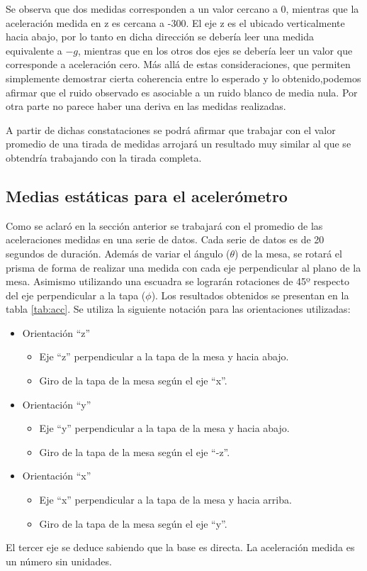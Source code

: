 \documentclass[main]{subfiles}
\begin{document}
Se observa que dos medidas corresponden a un valor cercano a 0, mientras que la aceleración medida en z es cercana a -300. El eje z es el ubicado verticalmente hacia abajo, por lo tanto en dicha dirección se debería leer una medida equivalente a $-g$, mientras que en los otros dos ejes se debería leer un valor que corresponde a aceleración cero. Más allá de estas consideraciones, que permiten simplemente demostrar cierta coherencia entre lo esperado y lo obtenido,podemos afirmar que el ruido observado es asociable a un ruido blanco de media nula. Por otra parte no parece haber una deriva en las medidas realizadas. 

A partir de dichas constataciones se podrá afirmar que trabajar con el valor promedio de una tirada de medidas arrojará un resultado muy similar al que se obtendría trabajando con la tirada completa. 


\subsection{Medias estáticas para el acelerómetro}

Como se aclaró en la sección anterior se trabajará con el promedio de las aceleraciones medidas en una serie de datos. Cada serie de datos es de 20 segundos de duración. Además de variar el ángulo ($\theta$) de la mesa, se rotará el prisma de forma de realizar una medida con cada eje perpendicular al plano de la mesa. Asimismo utilizando una escuadra se lograrán rotaciones de 45º respecto del eje perpendicular a la tapa ($\phi$). Los resultados obtenidos se presentan en la tabla \ref{tab:acc}. Se utiliza la siguiente notación para las orientaciones utilizadas:
\begin{itemize}
	\item Orientación ``z''
	\begin{itemize}
		\item Eje ``z'' perpendicular a la tapa de la mesa y hacia abajo.
		\item Giro de la tapa de la mesa según el eje ``x''.
	\end{itemize}
	\item Orientación ``y''
	\begin{itemize}
		\item Eje ``y'' perpendicular a la tapa de la mesa y hacia abajo.
		\item Giro de la tapa de la mesa según el eje ``-z''.
	\end{itemize}
	\item Orientación ``x''
	\begin{itemize}
		\item Eje ``x'' perpendicular a la tapa de la mesa y hacia arriba.
		\item Giro de la tapa de la mesa según el eje ``y''.
	\end{itemize}
\end{itemize}
El tercer eje se deduce sabiendo que la base es directa. La aceleración medida es un número sin unidades.
\end{document}
